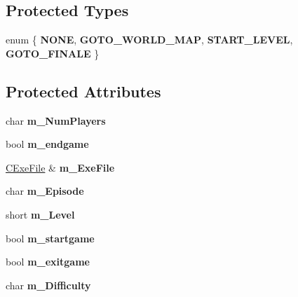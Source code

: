 \subsection*{Protected Types}
\begin{DoxyCompactItemize}
\item 
enum \{ {\bfseries NONE}, 
{\bfseries GOTO\_\-WORLD\_\-MAP}, 
{\bfseries START\_\-LEVEL}, 
{\bfseries GOTO\_\-FINALE}
 \}
\end{DoxyCompactItemize}
\subsection*{Protected Attributes}
\begin{DoxyCompactItemize}
\item 
\hypertarget{class_c_play_game_af62054c40937d41cd7ca5fd4b216d713}{
char {\bfseries m\_\-NumPlayers}}
\label{class_c_play_game_af62054c40937d41cd7ca5fd4b216d713}

\item 
\hypertarget{class_c_play_game_af93f0edb0df59ffdb783d941b34fe7e4}{
bool {\bfseries m\_\-endgame}}
\label{class_c_play_game_af93f0edb0df59ffdb783d941b34fe7e4}

\item 
\hypertarget{class_c_play_game_a0cc795965d43afc9dcdce97129eb5e9c}{
\hyperlink{class_c_exe_file}{CExeFile} \& {\bfseries m\_\-ExeFile}}
\label{class_c_play_game_a0cc795965d43afc9dcdce97129eb5e9c}

\item 
\hypertarget{class_c_play_game_a12970651bf91247a5f251376404351ca}{
char {\bfseries m\_\-Episode}}
\label{class_c_play_game_a12970651bf91247a5f251376404351ca}

\item 
\hypertarget{class_c_play_game_ab7a2148bf5264a428151d31881849aef}{
short {\bfseries m\_\-Level}}
\label{class_c_play_game_ab7a2148bf5264a428151d31881849aef}

\item 
\hypertarget{class_c_play_game_ac3869c5537eafa5de6e4e4ce78144adf}{
bool {\bfseries m\_\-startgame}}
\label{class_c_play_game_ac3869c5537eafa5de6e4e4ce78144adf}

\item 
\hypertarget{class_c_play_game_a0f1024fe6fcee7ef734f5e35057a6ec2}{
bool {\bfseries m\_\-exitgame}}
\label{class_c_play_game_a0f1024fe6fcee7ef734f5e35057a6ec2}

\item 
\hypertarget{class_c_play_game_a0491f05398333af04ca4324d224e6d43}{
char {\bfseries m\_\-Difficulty}}
\label{class_c_play_game_a0491f05398333af04ca4324d224e6d43}


\end{DoxyCompactItemize}
